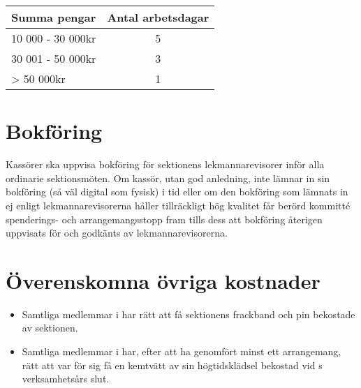 \documentclass[11pt, includeaddress]{classes/cthit}
\begin{document}
\begin{table}[h]
\centering
\begin{tabular}{  l  c }
	{\large{\textbf{Summa pengar}}} & {\large{\textbf{Antal arbetsdagar}}} \\
	\hline
	{10 000 - 30 000kr} & {5} \\
	{30 001 - 50 000kr} & {3} \\
	{> 50 000kr} & {1} \\
\end{tabular}
\end{table}

\section{Bokföring}
Kassörer ska uppvisa bokföring för sektionens lekmannarevisorer inför alla ordinarie sektionsmöten. Om kassör, utan god anledning, inte lämnar in sin bokföring (så väl digital som fysisk) i tid eller om den bokföring som lämnats in ej enligt lekmannarevisorerna håller tillräckligt hög kvalitet får berörd kommitté spenderings- och arrangemangsstopp fram tills dess att bokföring återigen uppvisats för och godkänts av lekmannarevisorerna.

\section{Överenskomna övriga kostnader}
\begin{itemize}
	\item Samtliga medlemmar i \FANBARERIT{} har rätt att få sektionens frackband och pin bekostade av sektionen.
	\item Samtliga medlemmar i \FANBARERIT{} har, efter att ha genomfört minst ett arrangemang, rätt att var för sig få en kemtvätt av sin högtidsklädsel bekostad vid \FANBARERIT{}s verksamhetsårs slut.
\end{itemize}
\end{document}
